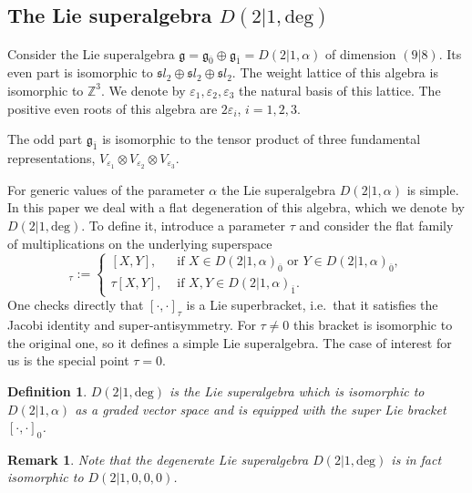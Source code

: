 \documentclass[10pt]{amsart}
\newtheorem{definition}[theorem]{Definition}
\newtheorem{remark}[theorem]{Remark}
\newcommand{\fg}{{\mathfrak g}}
\newcommand{\fsl}{{\mathfrak sl}}
\newcommand{\Dalpha}{D(2|1,\alpha)}
\newcommand{\Ddeg}{D(2|1,\mathrm{deg})}
\begin{document}
	\subsection{The Lie superalgebra \texorpdfstring{$\Ddeg$}{Ddeg}}\label{ssec:Ddeg}
	Consider the Lie superalgebra $\fg=\fg_{\overline 0}\oplus \fg_{\overline 1}=\Dalpha$ of dimension $(9|8)$. Its even part is isomorphic to $\fsl_2 \oplus \fsl_2 \oplus \fsl_2$.
	The weight lattice of this algebra is isomorphic to $\mathbb{Z}^3$. We denote by $\varepsilon_1, \varepsilon_2,\varepsilon_3$ the natural basis of this lattice. The positive even roots of this algebra are $2 \varepsilon_i$, $i=1,2,3$.
	
	The odd part $\fg_{\overline 1}$ is isomorphic to the tensor product of three fundamental representations, $V_{\varepsilon_1}\otimes V_{\varepsilon_2}\otimes V_{\varepsilon_3}$.
	
	For generic values of the parameter $\alpha$ the Lie superalgebra $\Dalpha$ is simple. In this paper we deal with a flat degeneration of this algebra, which we denote by $\Ddeg$. To define it, introduce a parameter $\tau$ and consider the flat family of multiplications on the underlying superspace
	\begin{equation*}
		[X,Y]_\tau:=\begin{cases}
			[X,Y], &\text{ if }X \in  \Dalpha_{\overline 0}\text{ or }Y \in  \Dalpha_{\overline 0},\\
			\tau [X,Y], &\text{ if }X,Y \in  \Dalpha_{\overline 1}.
		\end{cases}
	\end{equation*}
	One checks directly that $[\cdot,\cdot]_\tau$ is a Lie superbracket, i.e.\ that it satisfies the Jacobi identity and super-antisymmetry.
	For $\tau \neq 0$ this bracket is isomorphic to the original one, so it defines a simple Lie superalgebra. The case of interest for us is the special point $\tau=0$.
	\begin{definition}\label{def:degeneratedLieSuperalgebra}
		$\Ddeg$ is the Lie superalgebra which is isomorphic to $\Dalpha$ as a graded vector space and is equipped with the super Lie bracket $[\cdot,\cdot]_0$.
	\end{definition}
	\begin{remark}
		Note that the degenerate Lie superalgebra $\Ddeg$ is in fact isomorphic to $D(2|1,0,0,0)$.
	\end{remark}
	
\end{document}
